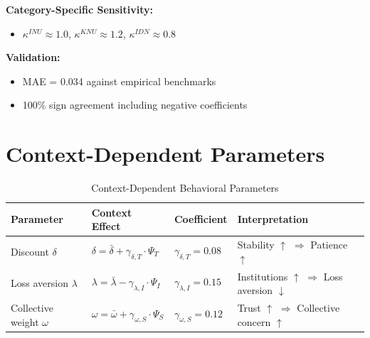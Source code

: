 \begin{tcolorbox}[colback=gray!5!white, colframe=gray!75!black, title=Section C.7 Summary]
\textbf{Category-Specific Sensitivity:}
\begin{itemize}
\item $\kappa^{INU} \approx 1.0$, $\kappa^{KNU} \approx 1.2$, $\kappa^{IDN} \approx 0.8$
\end{itemize}

\textbf{Validation:}
\begin{itemize}
\item MAE = 0.034 against empirical benchmarks
\item 100\% sign agreement including negative coefficients
\end{itemize}
\end{tcolorbox}

\section{Context-Dependent Parameters}
\label{sec:app-c-context-params}

\begin{table}[htbp]
\centering
\caption{Context-Dependent Behavioral Parameters}
\label{tab:app-c-context-params}
\renewcommand{\arraystretch}{1.4}
\begin{tabular}{@{}llll@{}}
\toprule
\textbf{Parameter} & \textbf{Context Effect} & \textbf{Coefficient} & \textbf{Interpretation} \\
\midrule
Discount $\delta$ & $\delta = \bar{\delta} + \gamma_{\delta,T} \cdot \Psi_T$ & $\gamma_{\delta,T} = 0.08$ & Stability $\uparrow$ $\Rightarrow$ Patience $\uparrow$ \\
Loss aversion $\lambda$ & $\lambda = \bar{\lambda} - \gamma_{\lambda,I} \cdot \Psi_I$ & $\gamma_{\lambda,I} = 0.15$ & Institutions $\uparrow$ $\Rightarrow$ Loss aversion $\downarrow$ \\
Collective weight $\omega$ & $\omega = \bar{\omega} + \gamma_{\omega,S} \cdot \Psi_S$ & $\gamma_{\omega,S} = 0.12$ & Trust $\uparrow$ $\Rightarrow$ Collective concern $\uparrow$ \\
\bottomrule
\end{tabular}
\end{table}

